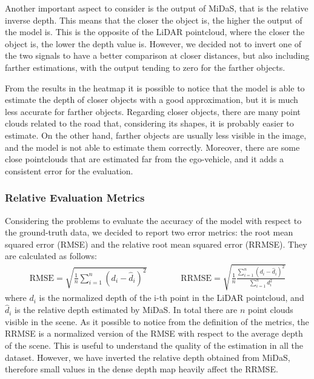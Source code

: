 Another important aspect to consider is the output of MiDaS, that is the relative 
inverse depth. This means that the closer the object is, the higher the output 
of the model is. This is the opposite of the LiDAR pointcloud, where the closer 
the object is, the lower the depth value is. However, we decided not to invert 
one of the two signals to have a better comparison at closer distances, but also 
including farther estimations, with the output tending to zero for the farther objects.

From the results in the heatmap it is possible to notice that the model is able 
to estimate the depth of closer objects with a good approximation, but it is 
much less accurate for farther objects. Regarding closer objects, there 
are many point clouds related to the road that, considering its shapes, it is 
probably easier to estimate. On the other hand, farther objects are usually 
less visible in the image, and the model is not able to estimate them correctly. 
Moreover, there are some close pointclouds that are estimated far from the ego-vehicle,
and it adds a consistent error for the evaluation.

\subsubsection{Relative Evaluation Metrics}
Considering the problems to evaluate the accuracy of the model with respect to 
the ground-truth data, we decided to report two error metrics: the root mean 
squared error (RMSE) and the relative root mean squared error (RRMSE). 
They are calculated as follows:
\begin{align}
    \text{RMSE} = \sqrt{\frac{1}{n} \sum_{i=1}^{n} \left(d_i - \hat{d}_i\right)^2} \qquad\qquad
    \text{RRMSE} = \sqrt{\frac{1}{n} \frac{\sum_{i=1}^{n}{\left(d_i - \hat{d}_i\right)^2}}{\sum_{i=1}^{n}d_i^2}} \nonumber
\end{align}
where $d_i$ is the normalized depth of the i-th point in the LiDAR pointcloud, 
and $\hat{d}_i$ is the relative depth estimated by MiDaS. In total 
there are $n$ point clouds visible in the scene. As it possible to notice from the 
definition of the metrics, the RRMSE is a normalized version of the RMSE with 
respect to the average depth of the scene. This is useful to understand the 
quality of the estimation in all the dataset. However, we have inverted the 
relative depth obtained from MiDaS, therefore small values in the dense depth 
map heavily affect the RRMSE.

